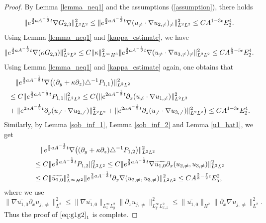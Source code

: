 \documentclass[12pt, reqno]{amsart}
\numberwithin{equation}{section}
\begin{document}
	\begin{proof}
		By Lemma \ref{lemma_neq1} and  the assumptions (\ref{assumption}), 
		there holds
		\begin{equation*}
			\|{\rm e}^{\frac32aA^{-\frac{1}{3}}t}
			\nabla G_{2,3}\|^2_{L^2L^2}\leq 
			\|{\rm e}^{\frac32aA^{-\frac{1}{3}}t}
			\nabla (u_{\neq}\cdot\nabla u_{2,\neq})_{\neq}\|^2_{L^2L^2}
			\leq 
			CA^{1-3\epsilon}E_2^4.
		\end{equation*}
		Using Lemma \ref{lemma_neq1} and \eqref{kappa_estimate}, we have
		\begin{equation*}
			\|{\rm e}^{\frac32aA^{-\frac{1}{3}}t}
			\nabla(\kappa G_{2,3})\|^2_{L^2L^2}
			\leq C\|\kappa \|_{L^{\infty}H^3}^2
			\|{\rm e}^{\frac32aA^{-\frac{1}{3}}t}
			\nabla (u_{\neq}\cdot\nabla u_{3,\neq})_{\neq}\|^2_{L^2L^2}
			\leq 
			CA^{\frac53-5\epsilon}E_2^4.
		\end{equation*}
		Using Lemma \ref{lemma_neq1} and \eqref{kappa_estimate} again,  one obtains that
		\begin{equation}\label{p11}
			\begin{aligned}
				&\quad\|{\rm e}^{\frac32aA^{-\frac{1}{3}}t}
				\nabla \big((\partial_y+\kappa\partial_z)
				\triangle^{-1}P_{1,1}\big) \|^2_{L^2L^2}\\
				&\leq C\|{\rm e}^{\frac32aA^{-\frac{1}{3}}t}P_{1,1} \|^2_{L^2L^2}
				\leq C\big(\|{\rm e}^{2aA^{-\frac{1}{3}}t}\partial_x(u_{\neq}\cdot\nabla u_{1,\neq})\|^2_{L^2L^2}\\
				&+\|{\rm e}^{2aA^{-\frac{1}{3}}t}\partial_y(u_{\neq}\cdot\nabla u_{2,\neq})\|^2_{L^2L^2}
				+\|{\rm e}^{2aA^{-\frac{1}{3}}t}\partial_z(u_{\neq}\cdot\nabla u_{3,\neq})\|^2_{L^2L^2}\big)\leq CA^{1-3\epsilon}E_2^4.
			\end{aligned}
		\end{equation}
		Similarly, by Lemma \ref{sob_inf_1}, Lemma \ref{sob_inf_2} and Lemma \ref{u1_hat1}, we get
		\begin{equation}\label{p12}
			\begin{aligned}
				&\quad\|{\rm e}^{\frac32aA^{-\frac{1}{3}}t}
				\nabla \big((\partial_y+\kappa\partial_z)
				\triangle^{-1}P_{1,2}\big) \|^2_{L^2L^2}\\
				&\leq C\|{\rm e}^{\frac32aA^{-\frac{1}{3}}t}P_{1,2} \|^2_{L^2L^2}
				\leq C\|{\rm e}^{\frac32aA^{-\frac{1}{3}}t} \nabla \widetilde{u_{1,0}}\partial_x(u_{2,\neq},u_{3,\neq}) \|^2_{L^2L^2}
				\\
				&\leq 
				C\|\widetilde{u_{1,0}}\|^2_{L^{\infty}H^2}
				\|{\rm e}^{\frac32aA^{-\frac{1}{3}}t}  \partial_x\nabla(u_{2,\neq},u_{3,\neq}) \|^2_{L^2L^2}
				\leq CA^{\frac53-\frac72\epsilon}E_5^2,
			\end{aligned}
		\end{equation}
		where we use 
		$$\|\nabla \widetilde{u_{1,0}}\partial_xu_{j,\neq} \|^2_{L^2}
		\leq 
		\|\nabla \widetilde{u_{1,0}}\|_{L^{\infty}_zL^2_y}
		\|\partial_xu_{j,\neq} \|^2_{L^{\infty}_yL^2_{x,z}}
		\leq 
		\| \widetilde{u_{1,0}}\|_{H^2}
		\|\partial_x\nabla u_{j,\neq} \|^2_{L^2}.$$
		Thus the proof of $\eqref{eq:g1g2}_1$
		is complete.
		

\end{proof}
\end{document}
